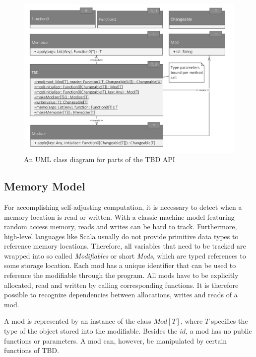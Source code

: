 \begin{figure}
\begin{center}
\includegraphics[scale=0.7]{uml/TBD.pdf}
\end{center}
\caption{An UML class diagram for parts of the TBD API}
\label{fig:tbd_uml}
\end{figure}


\subsection{Memory Model}

For accomplishing self-adjusting computation, it is necessary to detect when a memory location is read or written. With a classic machine model featuring random access memory, reads and writes can be hard to track. Furthermore, high-level languages like Scala usually do not provide primitive data types to reference memory locations. Therefore, all variables that need to be tracked are wrapped into so called \textit{Modifiables} or short \textit{Mods}, which are typed references to some storage location. Each mod has a unique identifier that can be used to reference the modifiable through the program. All mods have to be explicitly allocated, read and written by calling corresponding functions. It is therefore possible to recognize dependencies between allocations, writes and reads of a mod.

A mod is represented by an instance of the class $Mod[T]$, where $T$ specifies the type of the object stored into the modifiable. Besides the $id$, a mod has no public functions or parameters. A mod can, however, be manipulated by certain functions of TBD.

